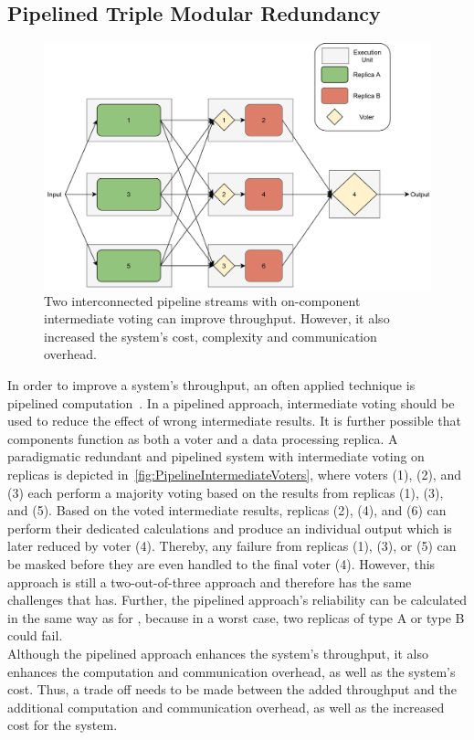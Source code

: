 \subsection{Pipelined Triple Modular Redundancy}
\begin{figure}[!hb]
	\centering
	\includegraphics[width=0.75\linewidth]{images/InterconnectedVoterPipeline}
	\caption{Two interconnected pipeline streams with on-component intermediate voting can improve throughput. However, it also increased the system's cost, complexity and communication overhead.}
	\label{fig:PipelineIntermediateVoters}
\end{figure}

In order to improve a system's throughput, an often applied technique is pipelined computation~\cite{TanenbaumSteen07}.
In a pipelined approach, intermediate voting should be used to reduce the effect of wrong intermediate results.
It is further possible that components function as both a voter and a data processing replica.
A paradigmatic redundant and pipelined system with intermediate voting on replicas is depicted in~\autoref{fig:PipelineIntermediateVoters}, where voters (1), (2), and (3) each perform a majority voting based on the results from replicas (1), (3), and (5).
Based on the voted intermediate results, replicas (2), (4), and (6) can perform their dedicated calculations and produce an individual output which is later reduced by voter (4).
Thereby, any failure from replicas (1), (3), or (5) can be masked before they are even handled to the final voter (4).
However, this approach is still a two-out-of-three approach and therefore has the same challenges that  has.
Further, the pipelined approach's reliability can be calculated in the same way as for , because in a worst case, two replicas of type A or type B could fail.
\\

Although the pipelined approach enhances the system's throughput, it also enhances the computation and communication overhead, as well as the system's cost.
Thus, a trade off needs to be made between the added throughput and the additional computation and communication overhead, as well as the increased cost for the system.

